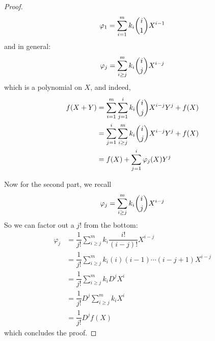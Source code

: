 \documentclass{article}
\begin{document}
\begin{proof}
            \begin{equation*}
                \varphi_{1} = \sum_{i = 1}^{m}k_{i}\dbinom{i}{1}X^{i - 1}
            \end{equation*}
        and in general:
            \begin{equation*}
                \varphi_{j} = \sum_{i \geq j}^{m}k_{i}\dbinom{i}{j}X^{i - j}
            \end{equation*}
        which is a polynomial on $X$, and indeed,
            \begin{align*}
                f(X + Y) &= \sum_{i = 1}^{m}\sum_{j = 1}^{i}k_{i}\dbinom{i}{j}X^{i - j}Y^{j} + f(X) \\
                         &= \sum_{j = 1}^{i}\sum_{i \geq j}^{m}k_{i}\dbinom{i}{j}X^{i - j}Y^{j} + f(X) \\
                         &= f(X) + \sum_{j = 1}^{i}\varphi_{j}(X)Y^{j}
            \end{align*}

        Now for the second part, we recall
            \begin{equation*}
                \varphi_{j} = \sum_{i \geq j}^{m}k_{i}\dbinom{i}{j}X^{i - j}
            \end{equation*}
        So we can factor out a $j!$ from the bottom:
            \begin{align*}
                \varphi_{j} &= \dfrac{1}{j!} \sum_{i \geq j}^{m}k_{i}\dfrac{i!}{(i - j)!}X^{i - j}\\ 
                            &= \dfrac{1}{j!} \sum_{i \geq j}^{m} k_{i} (i)(i - 1)\cdots (i - j + 1)X^{i - j} \\
                            &= \dfrac{1}{j!} \sum_{i \geq j}^{m} k_{i} D^{j}X^{i} \\
                            &= \dfrac{1}{j!} D^{j}\sum_{i \geq j}^{m} k_{i}X^{i} \\
                            &= \dfrac{1}{j!} D^{j}f(X)
            \end{align*}
        which concludes the proof.
    \end{proof}
\end{document}
